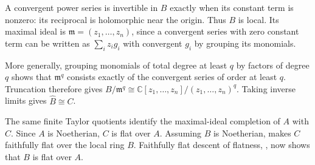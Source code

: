 A convergent power series is invertible in $B$ exactly when its constant term is nonzero: its reciprocal is holomorphic near the origin. Thus $B$ is local. Its maximal ideal is $\mathfrak{m}=(z_1,\ldots,z_n)$, since a convergent series with zero constant term can be written as $\sum_i z_i g_i$ with convergent $g_i$ by grouping its monomials.

More generally, grouping monomials of total degree at least $q$ by factors of degree $q$ shows that $\mathfrak{m}^q$ consists exactly of the convergent series of order at least $q$. Truncation therefore gives $B/\mathfrak{m}^q\cong\mathbb{C}[z_1,\ldots,z_n]/(z_1,\ldots,z_n)^q$. Taking inverse limits gives $\widehat B\cong C$.

The same finite Taylor quotients identify the maximal-ideal completion of $A$ with $C$. Since $A$ is Noetherian, $C$ is flat over $A$. Assuming $B$ is Noetherian,  makes $C$ faithfully flat over the local ring $B$. Faithfully flat descent of flatness, , now shows that $B$ is flat over $A$.
